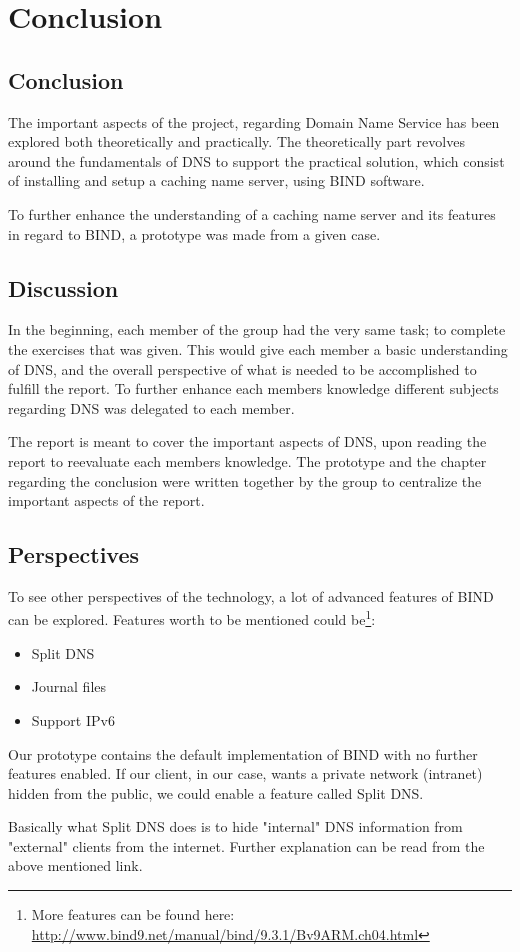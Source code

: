 \chapter{Conclusion}
\section{Conclusion}
The important aspects of the project, regarding Domain Name Service has been explored both theoretically and practically.  The theoretically part revolves around the fundamentals of DNS to support the practical solution, which consist of installing and setup a caching name server, using BIND software.

To further enhance the understanding of a caching name server and its features in regard to BIND, a prototype was made from a given case.

\section{Discussion}

In the beginning, each member of the group had the very same task; to complete the exercises that was given. This would give each member a basic understanding of DNS, and the overall perspective of what is needed to be accomplished to fulfill the report.
To further enhance each members knowledge different subjects regarding DNS was delegated to each member.

The report is meant to cover the important aspects of DNS, upon reading the report to reevaluate each members knowledge. The prototype and the chapter regarding the conclusion were written together by the group to centralize the important aspects of the report.
\section{Perspectives}

To see other perspectives of the technology, a lot of advanced features of BIND can be explored. Features worth to be mentioned could be\footnote{More features can be found here: \url{http://www.bind9.net/manual/bind/9.3.1/Bv9ARM.ch04.html}}:

\begin{itemize}
  \item Split DNS
  \item Journal files
  \item Support IPv6
\end{itemize}

Our prototype contains the default implementation of BIND with no further features enabled. If our client, in our case, wants a private network (intranet) hidden from the public, we could enable a feature called Split DNS.

Basically what Split DNS does is to hide "internal" DNS information from "external" clients from the internet. Further explanation can be read from the above mentioned link. 